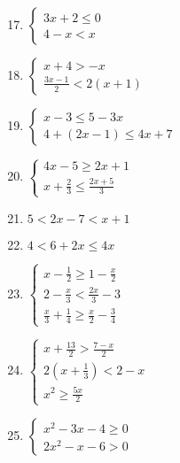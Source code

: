 \documentclass{report}
\begin{document}
\begin{multicols}{2}
    \begin{enumerate}
        \setcounter{enumi}{16}
        \item $\begin{cases}
                      3x + 2 \leq 0 \\
                      4-x < x
                  \end{cases}$
        \item $\begin{cases}
                      x + 4 > -x \\
                      \frac{3x - 1}{2} < 2(x+1)
                  \end{cases}$
        \item $\begin{cases}
                      x - 3 \leq 5 - 3x \\
                      4 + (2x - 1) \leq 4x + 7
                  \end{cases}$
        \item $\begin{cases}
                      4x - 5 \geq 2x + 1 \\
                      x + \frac{2}{3} \leq \frac{2x + 5}{3}
                  \end{cases}$
        \item $5 < 2x - 7 < x + 1$
        \item $4 < 6 + 2x \leq 4x$
        \item $\begin{cases}
                      x - \frac{1}{2} \geq 1 - \frac{x}{2} \\
                      2 - \frac{x}{3} < \frac{2x}{3} - 3   \\
                      \frac{x}{3} + \frac{1}{4} \geq \frac{x}{2} - \frac{3}{4}
                  \end{cases}$
        \item $\begin{cases}
                      x + \frac{13}{2} > \frac{7 - x}{2}  \\
                      2\left(x+\frac{1}{3}\right) < 2 - x \\
                      x^2 \geq \frac{5x}{2}
                  \end{cases}$
        \item $\begin{cases}
                      x^2 - 3x - 4 \geq 0 \\
                      2x^2 - x - 6 > 0
                  \end{cases}$

\end{enumerate}
\end{multicols}
\end{document}
